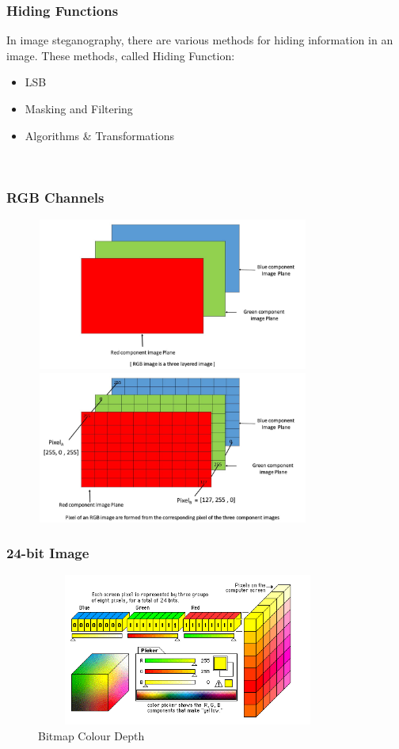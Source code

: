 \documentclass[12pt,hyperref={unicode}]{beamer}
\begin{document}
\begin{frame}
\frametitle{Hiding Functions}
In image steganography, there are various methods for hiding information in an image. These methods, called Hiding Function:\\
\begin{itemize}
    \item LSB
    \item Masking and Filtering
    \item Algorithms \& Transformations
\end{itemize} \\
\end{frame}

\begin{frame}
\frametitle{RGB Channels}
\begin{figure}
    \begin{overprint}
        \centering\includegraphics[width=9cm, height=5cm]{RGB-1.jpg}
        \centering\includegraphics[width=9cm, height=5cm]{Pixel.jpg}
    \end{overprint}
\end{figure}
\end{frame}

\begin{frame}
\frametitle{24-bit Image}
\begin{figure}[h]
\includegraphics[width=10cm, height=5cm]{24bit.png}
\centering
\caption{Bitmap Colour Depth}
\end{figure}
\end{frame}
\end{document}
